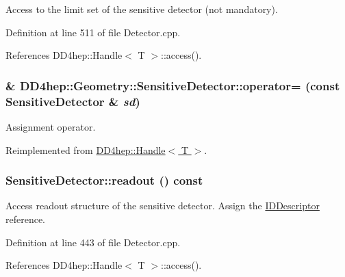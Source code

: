 Access to the limit set of the sensitive detector (not mandatory). 

Definition at line 511 of file Detector.cpp.

References DD4hep::Handle$<$ T $>$::access().\hypertarget{class_d_d4hep_1_1_geometry_1_1_sensitive_detector_a6119d874b9539c9c646641bd641209a5}{
\subsubsection[{operator=}]{\& DD4hep::Geometry::SensitiveDetector::operator= (const {\bf SensitiveDetector} \& {\em sd})}}
\label{class_d_d4hep_1_1_geometry_1_1_sensitive_detector_a6119d874b9539c9c646641bd641209a5}


Assignment operator. 

Reimplemented from \hyperlink{class_d_d4hep_1_1_handle_a9bbf8f498df42e81ad26fb00233505a6}{DD4hep::Handle$<$ T $>$}.\hypertarget{class_d_d4hep_1_1_geometry_1_1_sensitive_detector_ab805f5078384b7d8be6f58e109eefccd}{
\subsubsection[{readout}]{ SensitiveDetector::readout () const}}
\label{class_d_d4hep_1_1_geometry_1_1_sensitive_detector_ab805f5078384b7d8be6f58e109eefccd}


Access readout structure of the sensitive detector. Assign the \hyperlink{class_d_d4hep_1_1_geometry_1_1_i_d_descriptor}{IDDescriptor} reference. 

Definition at line 443 of file Detector.cpp.

References DD4hep::Handle$<$ T $>$::access().

